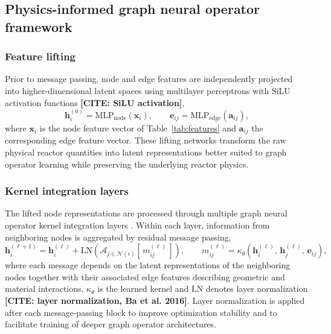 \documentclass[preprint,12pt]{elsarticle}
\newcommand{\todocite}[1]{\textbf{[CITE: #1]}}
\begin{document}
\subsection{Physics-informed graph neural operator framework}
\label{sec:pigno}

\subsubsection{Feature lifting}
\label{sec:lifting}

Prior to message passing, node and edge features are independently projected
into higher-dimensional latent spaces using multilayer perceptrons with SiLU
activation functions \todocite{SiLU activation},
\begin{equation}
\mathbf{h}_i^{(0)} = \mathrm{MLP}_{\mathrm{node}}(\mathbf{x}_i),
\qquad
\mathbf{e}_{ij} = \mathrm{MLP}_{\mathrm{edge}}(\mathbf{a}_{ij}),
\label{eq:lift}
\end{equation}
where $\mathbf{x}_i$ is the node feature vector of Table~\ref{tab:features} and
$\mathbf{a}_{ij}$ the corresponding edge feature vector. These lifting networks
transform the raw physical reactor quantities into latent representations
better suited to graph operator learning while preserving the underlying
reactor physics.

\subsubsection{Kernel integration layers}
\label{sec:kernel}

The lifted node representations are processed through multiple graph neural
operator kernel integration layers \citep{li2020,kovachki2023}. Within each layer, information from
neighboring nodes is aggregated by residual message passing,
\begin{equation}
\mathbf{h}_i^{(\ell+1)} = \mathbf{h}_i^{(\ell)}
+ \mathrm{LN}\!\left(
\mathcal{A}_{j\in\mathcal{N}(i)}\!\left[\,
m_{ij}^{(\ell)} \,\right]
\right),
\qquad
m_{ij}^{(\ell)} =
\kappa_\theta\!\left(\mathbf{h}_i^{(\ell)},\,\mathbf{h}_j^{(\ell)},\,\mathbf{e}_{ij}\right),
\label{eq:kernel}
\end{equation}
where each message depends on the latent representations of the neighboring
nodes together with their associated edge features describing geometric and
material interactions, $\kappa_\theta$ is the learned kernel and $\mathrm{LN}$
denotes layer normalization \todocite{layer normalization, Ba et al. 2016}.
Layer normalization is applied after each
message-passing block to improve optimization stability and to facilitate
training of deeper graph operator architectures.
\end{document}
